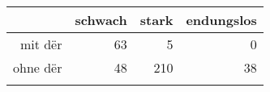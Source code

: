 \begin{tabular}{rrrr}
  \lsptoprule
 & schwach & stark & endungslos \\ 
  \midrule
mit dër & 63 & 5 & 0 \\ 
  ohne dër & 48 & 210 & 38 \\ 
   \lspbottomrule
\end{tabular}
